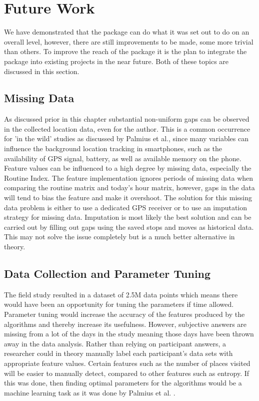 \clearpage
\section{Future Work}
We have demonstrated that the package can do what it was set out to do on an overall level, however, there are still improvements to be made, some more trivial than others. To improve the reach of the package it is the plan to integrate the package into existing projects in the near future. Both of these topics are discussed in this section.

\subsection{Missing Data}
As discussed prior in this chapter substantial non-uniform gaps can be observed in the collected location data, even for the author. This is a common occurrence for 'in the wild' studies as discussed by Palmius et al.\cite{palmius2017}, since many variables can influence the background location tracking in smartphones, such as the availability of GPS signal, battery, as well as available memory on the phone. \\

Feature values can be influenced to a high degree by missing data, especially the Routine Index. The feature implementation ignores periods of missing data when comparing the routine matrix and today's hour matrix, however, gaps in the data will tend to bias the feature and make it overshoot. The solution for this missing data problem is either to use a dedicated GPS receiver or to use an imputation strategy for missing data. Imputation is most likely the best solution and can be carried out by filling out gaps using the saved stops and moves as historical data. This may not solve the issue completely but is a much better alternative in theory.

\subsection{Data Collection and Parameter Tuning}
The field study resulted in a dataset of 2.5M data points which means there would have been an opportunity for tuning the parameters if time allowed. Parameter tuning would increase the accuracy of the features produced by the algorithms and thereby increase its usefulness. However, subjective answers are missing from a lot of the days in the study meaning those days have been thrown away in the data analysis. Rather than relying on participant answers, a researcher could in theory manually label each participant's data sets with appropriate feature values. Certain features such as the number of places visited will be easier to manually detect, compared to other features such as entropy. If this was done, then finding optimal parameters for the algorithms would be a machine learning task as it was done by Palmius et al. \cite{palmius2017}. \\

